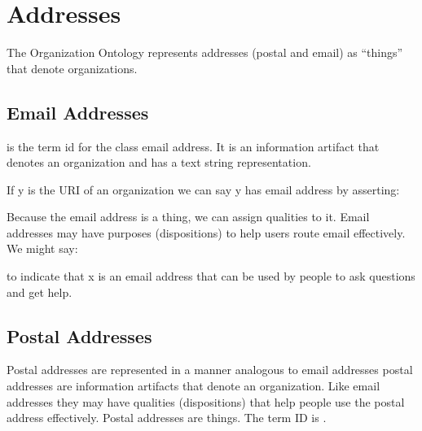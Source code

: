 \documentclass[letterpaper,10pt,english]{sphinxmanual}
\begin{document}
\chapter{Addresses}
\label{\detokenize{addresses:index-0}}\label{\detokenize{addresses:id1}}\label{\detokenize{addresses::doc}}
\sphinxAtStartPar
The Organization Ontology represents addresses (postal and email) as “things” that denote
organizations.


\section{Email Addresses}
\label{\detokenize{addresses:email-addresses}}
\sphinxAtStartPar
{} is the term id for the class email address. It is an information artifact
that denotes an
organization and has a text string representation.

\sphinxAtStartPar
If y is the URI of an organization we can say y has email address  by
asserting:

\begin{sphinxVerbatim}[commandchars=\\\{\}]
  
  
  
\end{sphinxVerbatim}

\sphinxAtStartPar
Because the email address is a thing, we can assign qualities to it. Email addresses may
have purposes (dispositions) to help users route email effectively. We might say:

\begin{sphinxVerbatim}[commandchars=\\\{\}]
  
  
\end{sphinxVerbatim}

\sphinxAtStartPar
to indicate that x is an email address that can be used by people to ask questions and
get help.


\section{Postal Addresses}
\label{\detokenize{addresses:postal-addresses}}
\sphinxAtStartPar
Postal addresses are represented in a manner analogous to email addresses \textendash{} postal
addresses are information artifacts that denote an organization. Like email
addresses they may have qualities (dispositions) that help people use the postal
address effectively. Postal addresses are things. The term ID is .
\end{document}
